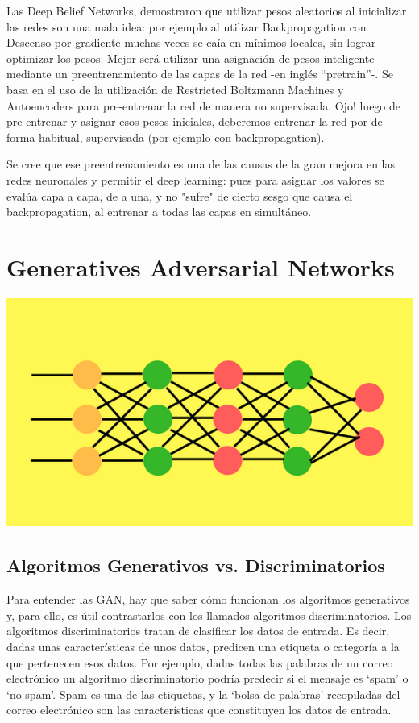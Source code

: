 \documentclass[a4paper]{article}
\begin{document}
Las Deep Belief Networks, demostraron que utilizar pesos 
aleatorios al inicializar las redes son una mala idea: por ejemplo 
al utilizar Backpropagation con Descenso por gradiente muchas 
veces se caía en mínimos locales, sin lograr optimizar los pesos. 
Mejor será utilizar una asignación de pesos inteligente mediante 
un preentrenamiento de las capas de la red -en inglés “pretrain”-. 
Se basa en el uso de la utilización de Restricted Boltzmann 
Machines y Autoencoders para pre-entrenar la red de manera no 
supervisada. Ojo! luego de pre-entrenar y asignar esos pesos 
iniciales, deberemos entrenar la red por de forma habitual, 
supervisada (por ejemplo con backpropagation).

Se cree que ese preentrenamiento es una de las causas de la gran 
mejora en las redes neuronales y permitir el deep learning: pues 
para asignar los valores se evalúa capa a capa, de a una, y no 
"sufre" de cierto sesgo que causa el backpropagation, al entrenar 
a todas las capas en simultáneo.

\section{Generatives Adversarial Networks}
\begin{center}

\includegraphics[scale=0.5]{./images/gan.png}

\end{center}
\subsection{Algoritmos Generativos vs. Discriminatorios}

Para entender las GAN, hay que saber cómo funcionan los algoritmos 
generativos y, para ello, es útil contrastarlos con los llamados 
algoritmos discriminatorios. Los algoritmos discriminatorios 
tratan de clasificar los datos de entrada. Es decir, dadas unas 
características de unos datos, predicen una etiqueta o categoría a 
la que pertenecen esos datos. Por ejemplo, dadas todas las palabras 
de un correo electrónico un 
algoritmo discriminatorio podría predecir si el mensaje es `spam' 
o `no spam'. Spam es una de las etiquetas, y la `bolsa de 
palabras' recopiladas del correo electrónico son las 
características que constituyen los datos de entrada.
\end{document}
